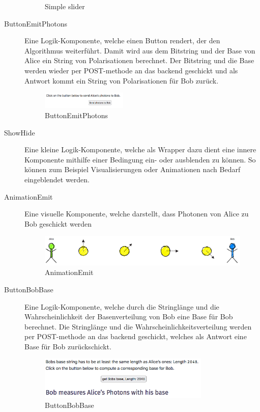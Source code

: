 \documentclass[a4paper,10.2pt,pdftex]{scrartcl}%
\begin{document}
\begin{description}
\begin{figure}[h]
	\caption{Simple slider}
\end{figure}
\item[ButtonEmitPhotons] Eine Logik-Komponente, welche einen Button rendert, der den Algorithmus weiterführt. Damit wird aus dem Bitstring und der Base von Alice ein String von Polarisationen berechnet. Der Bitstring und die Base werden wieder per POST-methode an das backend geschickt und als Antwort kommt ein String von Polarisationen für Bob zurück.
\begin{figure}[h]
	\centering
  \includegraphics[width=0.4\textwidth]{graphics/component_button_emit_photons.png}
	\caption{ButtonEmitPhotons}
\end{figure}
\item[ShowHide] Eine kleine Logik-Komponente, welche als Wrapper dazu dient eine innere Komponente mithilfe einer Bedingung ein- oder ausblenden zu können. So können zum Beispiel Visualisierungen oder Animationen nach Bedarf eingeblendet werden.
\item[AnimationEmit] Eine visuelle Komponente, welche darstellt, dass Photonen von Alice zu Bob geschickt werden
\begin{figure}[h]
	\centering
  \includegraphics[width=\textwidth]{graphics/component_animation_emit.png}
	\caption{AnimationEmit}
\end{figure}
\item[ButtonBobBase] Eine Logik-Komponente, welche durch die Stringlänge und die Wahrscheinlichkeit der Basenverteilung von Bob eine Base für Bob berechnet. Die Stringlänge und die Wahrscheinlichkeitsverteilung werden per POST-methode an das backend geschickt, welches als Antwort eine Base für Bob zurückschickt. 
\begin{figure}[h]
	\centering
  \includegraphics[width=0.8\textwidth]{graphics/component_button_bob_base.png}
	\caption{ButtonBobBase}
\end{figure}
\end{description}
\end{document}
